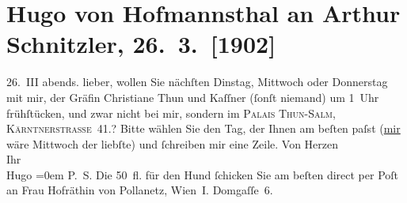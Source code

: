 

         
         \renewcommand{\erwaehntePersonen}{Personen: Rudolf Kassner, Malvine von Pollanetz, Christiane von Thun-Hohenstein-Salm-Reifferscheidt}
         \renewcommand{\erwaehnteOrte}{Orte: Domgasse, Kärntner Straße, Palais Thun-Salm, Wien}
         \renewcommand{\erwaehnteWerke}{}
               \section[Hugo von Hofmannsthal an Arthur Schnitzler, 26. 3. {[}1902{]}]{ Hugo von Hofmannsthal an Arthur Schnitzler, 26. 3. {[}1902{]}}\nopagebreak{}\rehead{ }\begin{ledgroupsized}[t]{13cm}\normalsize\beginnumbering \toendnotes[C]{\smallbreak\pagebreak[2]} 
\pstart
           \raggedleft{}{\pb}26. III{ }abends.\pend
           \pstart
           lieber, wollen Sie nächſten Dinstag, Mittwoch oder Donnerstag mit
               mir, der Gräfin Christiane Thun und Kaſſner (ſonſt niemand) um 1 Uhr
               frühſtücken, und zwar nicht bei mir, sondern im \textsc{Palais Thun-Salm}, {\pb}\textsc{Kärntnerstrasse 41}.?\pend
           \pstart
           Bitte wählen Sie den Tag, der Ihnen am beſten paſst (\uline{mir} wäre Mittwoch der liebſte) und ſchreiben mir  eine Zeile.\pend
           \pstart
           Von Herzen{\\[\baselineskip]}Ihr{\\[\baselineskip]}\spacefill\mbox{Hugo}\pend
           \leftskip=0em{}\pstart
           \noindent{}P. S. Die 50 fl. für den Hund ſchicken Sie {\pb}am beſten direct per Poſt an
                  Frau Hofräthin von Pollanetz, Wien I. Domgaſſe 6.\pend
           
         
         \endnumbering{}\end{ledgroupsized}  \newcommand{\dateiname}{L01209}\newcommand{\titel}{Hugo von Hofmannsthal an Arthur Schnitzler, 26. 3. [1902]}\newcommand{\editorInnen}{Martin Anton Müller und Gerd-Hermann Susen}
      